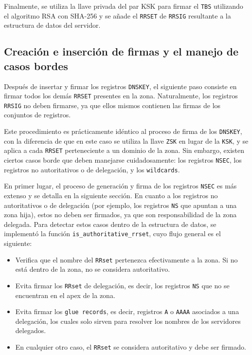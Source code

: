 Finalmente, se utiliza la llave privada del par KSK para firmar el \texttt{TBS} utilizando el algoritmo RSA con SHA-256 y se añade el \texttt{RRSET} de \texttt{RRSIG} resultante a la estructura de datos del servidor.


\subsection{Creación e inserción de firmas y el manejo de casos bordes}\label{sec:insercion-firmas}

Después de insertar y firmar los registros \texttt{DNSKEY}, el siguiente paso consiste en firmar todos los demás \texttt{RRSET} presentes en la zona.
Naturalmente, los registros \texttt{RRSIG} no deben firmarse, ya que ellos mismos contienen las firmas de los conjuntos de registros.

Este procedimiento es prácticamente idéntico al proceso de firma de los \texttt{DNSKEY}, con la diferencia de que en este caso se utiliza la llave \texttt{ZSK} en lugar de la 
\texttt{KSK}, y se aplica a cada \texttt{RRSET} perteneciente a un dominio de la zona. Sin embargo, existen ciertos casos borde que deben manejarse cuidadosamente: 
los registros \texttt{NSEC}, los registros no autoritativos o de delegación, y los \texttt{wildcards}.

En primer lugar, el proceso de generación y firma de los registros \texttt{NSEC} es más extenso y se detalla en la siguiente sección.
En cuanto a los registros no autoritativos o de delegación (por ejemplo, los registros \texttt{NS} que apuntan a una zona hija), estos no deben ser firmados, ya que son responsabilidad de la zona delegada.
Para detectar estos casos dentro de la estructura de datos, se implementó la función \texttt{is\_authoritative\_rrset}, cuyo flujo general es el siguiente:

\begin{itemize}
    \item Verifica que el nombre del \texttt{RRset} pertenezca efectivamente a la zona. Si no está dentro de la zona, no se considera autoritativo.

    \item Evita firmar los \texttt{RRset} de delegación, es decir, los registros \texttt{NS} que no se encuentran en el apex de la zona.

    \item Evita firmar los \texttt{glue records}, es decir, registros \texttt{A} o \texttt{AAAA} asociados a una delegación, los cuales solo sirven para resolver los nombres de los servidores delegados.

    \item En cualquier otro caso, el \texttt{RRset} se considera autoritativo y debe ser firmado.
\end{itemize}

